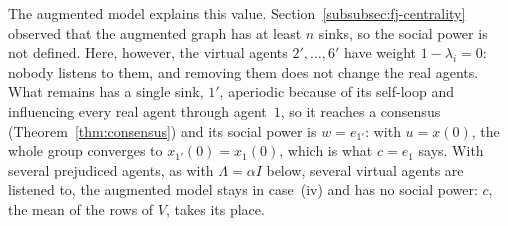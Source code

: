 The augmented model explains this value. Section~\ref{subsubsec:fj-centrality}
observed that the augmented graph has at least $n$ sinks, so the social power is not defined.
Here, however, the virtual agents $2', \dots, 6'$ have weight $1 - \lambda_i = 0$:
nobody listens to them, and removing them does not change the real agents. What
remains has a single sink, $1'$, aperiodic because of its self-loop and influencing every
real agent through agent~$1$,
 so it reaches a consensus (Theorem~\ref{thm:consensus}) and
its social power is $w = e_{1'}$: with $u = x(0)$, the whole group converges to
$x_{1'}(0) = x_1(0)$, which is what $c = e_1$ says. With several prejudiced agents, as
with $\Lambda = \alpha I$ below, several virtual agents are listened to, the augmented
model stays in case~(iv) and has no social power: $c$, the mean of the rows of $V$,
takes its place.

